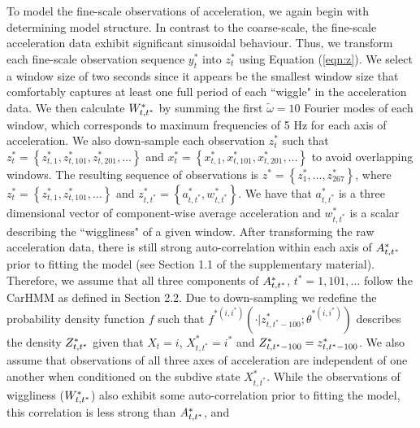 To model the fine-scale observations of acceleration, we again begin with determining model structure. In contrast to the coarse-scale, the fine-scale acceleration data exhibit significant sinusoidal behaviour. Thus, we transform each fine-scale observation sequence $y_t^*$ into $z_t^*$ using Equation (\ref{eqn:z}). We select a window size of two seconds since it appears be the smallest window size that comfortably captures at least one full period of each ``wiggle" in the acceleration data.
%
We then calculate $W^*_{t,t^*}$ by summing the first $\tilde \omega = 10$ Fourier modes of each window, which corresponds to maximum frequencies of 5 Hz for each axis of acceleration. We also down-sample each observation $z^*_t$ such that $z^*_t = \left\{z^*_{t,1},z^*_{t,101},z^*_{t,201},\ldots\right\}$ and $x^*_t = \left\{x^*_{t,1},x^*_{t,101},x^*_{t,201},\ldots\right\}$ to avoid overlapping windows. The resulting sequence of observations is $z^* = \left\{z^*_1,\ldots,z^*_{267}\right\}$, where $z^*_t = \left\{z^*_{t,1},z^*_{t,101},\ldots\right\}$ and $z^*_{t,t^*} = \left\{a^*_{t,t^*},w^*_{t,t^*}\right\}$. We have that $a^*_{t,t^*}$ is a three dimensional vector of component-wise average acceleration and $w^*_{t,t^*}$ is a scalar describing the ``wiggliness" of a given window.
%
After transforming the raw acceleration data, there is still strong auto-correlation within each axis of $A^*_{t,t^*}$ prior to fitting the model (see Section 1.1 of the supplementary material). Therefore, we assume that all three components of $A^*_{t,t^*}$, $t^* = 1,101,\ldots$ follow the CarHMM as defined in Section 2.2. Due to down-sampling we redefine the probability density function $f$ such that $f^{*(i,i^*)}(\cdot|z^*_{t,t^*-100}; \theta^{*(i,i^*)})$ describes the density $Z^*_{t,t^*}$ given that $X_t = i$, $X^*_{t,t^*} = i^*$ and $Z^*_{t,t^*-100} = z^*_{t,t^*-100}$. We also assume that observations of all three axes of acceleration are independent of one another when conditioned on the subdive state $X^*_{t,t^*}$.
%
%
While the observations of wiggliness ($W^*_{t,t^*}$) also exhibit some auto-correlation prior to fitting the model, this correlation is less strong than $A^*_{t,t^*}$, and 
